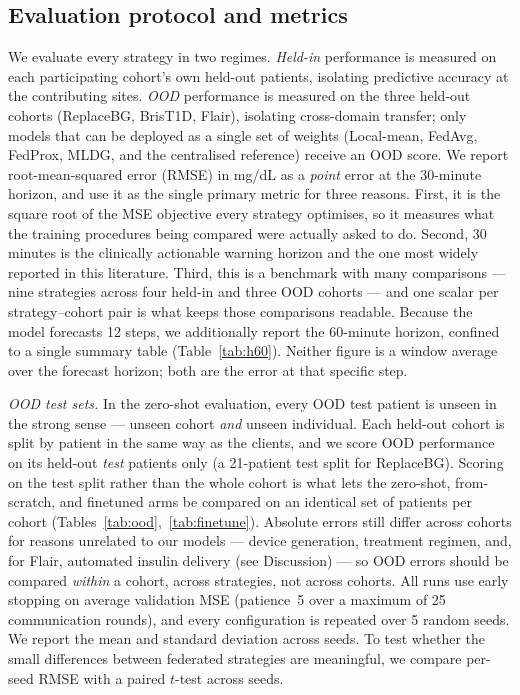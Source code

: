 \documentclass[10pt,letterpaper]{article}
\begin{document}
\subsection*{Evaluation protocol and metrics}

We evaluate every strategy in two regimes. \emph{Held-in} performance is measured
on each participating cohort's own held-out patients, isolating predictive
accuracy at the contributing sites. \emph{OOD} performance is measured on the
three held-out cohorts (ReplaceBG, BrisT1D, Flair), isolating cross-domain transfer; only models that can be deployed as a
single set of weights (Local-mean, FedAvg, FedProx, MLDG, and the centralised
reference) receive an OOD score.
We report root-mean-squared error (RMSE) in mg/dL as a \emph{point} error at the
30-minute horizon, and use it as the single primary metric for three reasons.
First, it is the square root of the MSE objective every strategy optimises, so it
measures what the training procedures being compared were actually asked to do.
Second, 30 minutes is the clinically actionable warning horizon and the one most
widely reported in this literature. Third, this is a benchmark with many comparisons --- nine
strategies across four held-in and three OOD cohorts --- and one scalar per
strategy--cohort pair is what keeps those comparisons readable. Because the model
forecasts 12 steps, we additionally report the 60-minute horizon, confined to a
single summary table (Table~\ref{tab:h60}). Neither figure is a window average
over the forecast horizon; both are the error at that specific step.

\emph{OOD test sets.} In the zero-shot evaluation, every OOD test patient is
unseen in the strong sense --- unseen cohort \emph{and} unseen individual. Each held-out cohort is split by patient in
the same way as the clients, and we score OOD performance on its held-out
\emph{test} patients only (a 21-patient test split for ReplaceBG). Scoring on the
test split rather than the whole cohort is what lets the zero-shot, from-scratch,
and finetuned arms be compared on an identical set of patients per cohort
(Tables~\ref{tab:ood},~\ref{tab:finetune}). Absolute errors still differ across
cohorts for reasons unrelated to our models --- device generation, treatment
regimen, and, for Flair, automated insulin delivery (see Discussion) --- so OOD
errors should be compared \emph{within} a cohort, across strategies, not across
cohorts. All runs use early stopping on average validation MSE (patience~5 over a
maximum of 25 communication rounds), and every configuration is repeated over 5
random seeds. We report the mean and standard deviation across seeds. To test
whether the small differences between federated strategies are meaningful, we
compare per-seed RMSE with a paired $t$-test across seeds.
\end{document}
